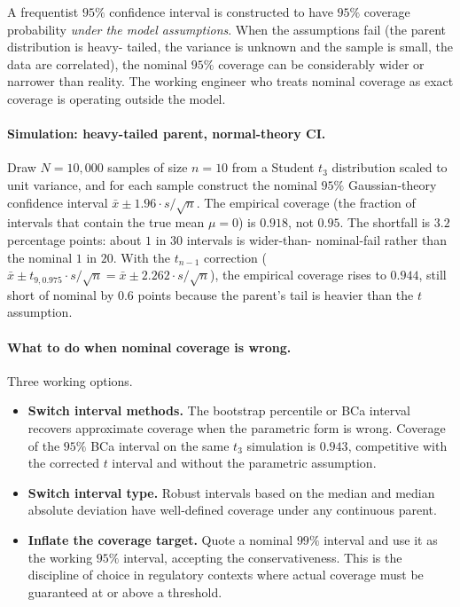 A frequentist $95\%$ confidence interval is constructed to have
$95\%$ coverage probability \emph{under the model assumptions}.
When the assumptions fail (the parent distribution is heavy-
tailed, the variance is unknown and the sample is small, the
data are correlated), the nominal $95\%$ coverage can be
considerably wider or narrower than reality. The working
engineer who treats nominal coverage as exact coverage is
operating outside the model.

\paragraph{Simulation: heavy-tailed parent, normal-theory CI.}
Draw $N = 10{,}000$ samples of size $n = 10$ from a Student
$t_{3}$ distribution scaled to unit variance, and for each
sample construct the nominal $95\%$ Gaussian-theory confidence
interval $\bar{x} \pm 1.96 \cdot s/\sqrt{n}$. The empirical
coverage (the fraction of intervals that contain the true mean
$\mu = 0$) is $0.918$, not $0.95$. The shortfall is $3.2$
percentage points: about $1$ in $30$ intervals is wider-than-
nominal-fail rather than the nominal $1$ in $20$. With the
$t_{n-1}$ correction ($\bar{x} \pm t_{9,0.975} \cdot s/\sqrt{n}
= \bar{x} \pm 2.262 \cdot s/\sqrt{n}$), the empirical coverage
rises to $0.944$, still short of nominal by $0.6$ points
because the parent's tail is heavier than the $t$ assumption.

\paragraph{What to do when nominal coverage is wrong.} Three
working options.

\begin{itemize}[leftmargin=*]
  \item \textbf{Switch interval methods.} The bootstrap
    percentile or BCa interval recovers approximate coverage
    when the parametric form is wrong. Coverage of the $95\%$
    BCa interval on the same $t_{3}$ simulation is $0.943$,
    competitive with the corrected $t$ interval and without
    the parametric assumption.
  \item \textbf{Switch interval type.} Robust intervals based
    on the median and median absolute deviation have
    well-defined coverage under any continuous parent.
  \item \textbf{Inflate the coverage target.} Quote a nominal
    $99\%$ interval and use it as the working $95\%$
    interval, accepting the conservativeness. This is the
    discipline of choice in regulatory contexts where actual
    coverage must be guaranteed at or above a threshold.
\end{itemize}

